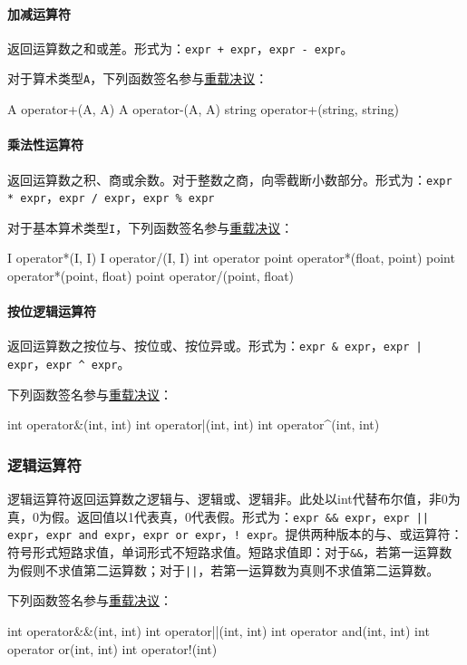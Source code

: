 \documentclass{article}
\begin{document}
\paragraph{加减运算符} 返回运算数之和或差。形式为：\verb|expr + expr|，\verb|expr - expr|。

对于算术类型\verb|A|，下列函数签名参与\hyperref[chongzai]{重载决议}：
\begin{MUAvbt}
A operator+(A, A)
A operator-(A, A)
string operator+(string, string)
\end{MUAvbt}

\paragraph{乘法性运算符} 返回运算数之积、商或余数。对于整数之商，向零截断小数部分。形式为：\verb|expr * expr|，\verb|expr / expr|，\verb|expr % expr|

对于基本算术类型\verb|I|，下列函数签名参与\hyperref[chongzai]{重载决议}：
\begin{MUAvbt}
I operator*(I, I)
I operator/(I, I)
int operator%
point operator*(float, point)
point operator*(point, float)
point operator/(point, float)
\end{MUAvbt}

\paragraph{按位逻辑运算符} 返回运算数之按位与、按位或、按位异或。形式为：\verb|expr & expr|，\verb&expr | expr&，\verb|expr ^ expr|。

下列函数签名参与\hyperref[chongzai]{重载决议}：
\begin{MUAvbt}
int operator&(int, int)
int operator|(int, int)
int operator^(int, int)
\end{MUAvbt}

\subsubsection{逻辑运算符}
\label{luoji}

逻辑运算符返回运算数之逻辑与、逻辑或、逻辑非。此处以int代替布尔值，非0为真，0为假。返回值以1代表真，0代表假。形式为：\verb|expr && expr|，\verb&expr || expr&，\verb|expr and expr|，\verb&expr or expr&，\verb|! expr|。提供两种版本的与、或运算符：符号形式短路求值，单词形式不短路求值。短路求值即：对于\verb|&&|，若第一运算数为假则不求值第二运算数；对于\verb&||&，若第一运算数为真则不求值第二运算数。

下列函数签名参与\hyperref[chongzai]{重载决议}：
\begin{MUAvbt}
int operator&&(int, int)
int operator||(int, int)
int operator and(int, int)
int operator or(int, int)
int operator!(int)
\end{MUAvbt}
\end{document}
